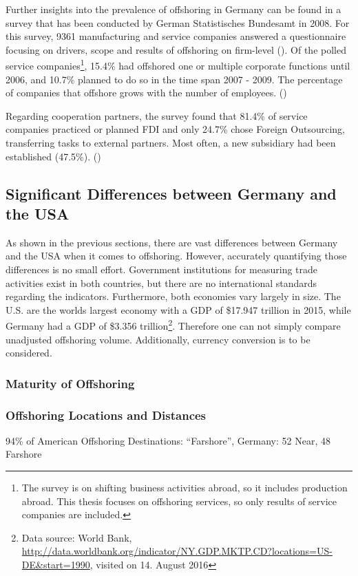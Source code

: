 Further insights into the prevalence of offshoring in Germany can be found in a survey that has been conducted by German Statistisches Bundesamt in 2008. For this survey, 9361 manufacturing and service companies answered a questionnaire focusing on drivers, scope and results of offshoring on firm-level (\cite[p. 7]{StatistischesBundesamt.2008}). Of the polled service companies\footnote{The survey is on shifting business activities abroad, so it includes production abroad. This thesis focuses on offshoring services, so only results of service companies are included.}, 15.4\% had offshored one or multiple corporate functions until 2006, and 10.7\% planned to do so in the time span 2007 - 2009. The percentage of companies that offshore grows with the number of employees. (\cite[p. 11]{StatistischesBundesamt.2008})

Regarding cooperation partners, the survey found that 81.4\% of service companies practiced or planned \ac{FDI} and only 24.7\% chose Foreign Outsourcing, transferring tasks to external partners. Most often, a new subsidiary had been established (47.5\%). (\cite[p. 18]{StatistischesBundesamt.2008})



\subsection{Significant Differences between Germany and the USA}
\label{sec:DifferencesUSGER}
As shown in the previous sections, there are vast differences between Germany and the USA when it comes to offshoring. However, accurately quantifying those differences is no small effort. Government institutions for measuring trade activities exist in both countries, but there are no international standards regarding the indicators. Furthermore, both economies vary largely in size. The U.S. are the worlds largest economy with a \ac{GDP} of \$17.947 trillion in 2015, while Germany had a \ac{GDP} of \$3.356 trillion\footnote{Data source: World Bank, \url{http://data.worldbank.org/indicator/NY.GDP.MKTP.CD?locations=US-DE&start=1990}, visited on 14. August 2016}. Therefore one can not simply compare unadjusted offshoring volume. Additionally, currency conversion is to be considered. 

\subsubsection{Maturity of Offshoring}

\subsubsection{Offshoring Locations and Distances}
94\% of American Offshoring Destinations: ``Farshore'', Germany: 52 Near, 48 Farshore \cite[pp. 175f]{Hutzschenreuter.2007}
